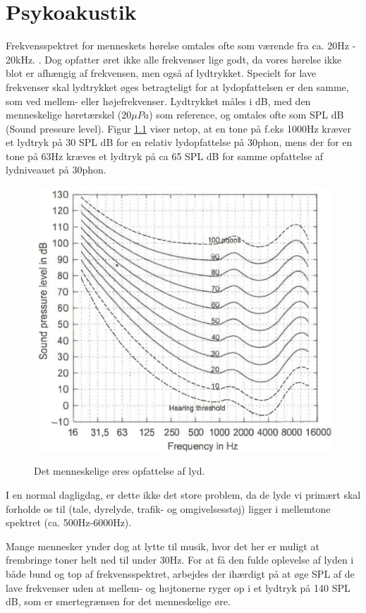 \chapter{Psykoakustik}

Frekvensspektret for menneskets hørelse omtales ofte som værende fra ca. 20Hz - 20kHz. \cite{Elektroakustik}. Dog opfatter øret ikke alle frekvenser lige godt, da vores hørelse ikke blot er afhængig af frekvensen, men også af lydtrykket. Specielt for lave frekvenser skal lydtrykket øges betragteligt for at lydopfattelsen er den samme, som ved mellem- eller højefrekvenser. Lydtrykket måles i dB, med den menneskelige høretærskel ($20\mu Pa$)  som reference, og omtales ofte som SPL dB (Sound pressure level). Figur \ref{fig:SPL} viser netop, at en tone på f.eks 1000Hz kræver et lydtryk på 30 SPL dB for en relativ lydopfattelse på 30phon, mens der for en tone på 63Hz kræves et lydtryk på ca 65 SPL dB for samme opfattelse af lydniveauet på 30phon.

\begin{figure}[h!]
	\centering
	\includegraphics[width=.6\textwidth]{Pics/SPL.PNG}
	\label{fig:SPL}
	\caption{Det menneskelige øres opfattelse af lyd. \cite{Elektroakustik}}
\end{figure}

I en normal dagligdag, er dette ikke det store problem, da de lyde vi primært skal forholde os til (tale, dyrelyde, trafik- og omgivelsesstøj) ligger i mellemtone spektret (ca. 500Hz-6000Hz). 

Mange mennesker ynder dog at lytte til musik, hvor det her er muligt at frembringe toner helt ned til under 30Hz. For at få den fulde oplevelse af lyden i både bund og top af frekvensspektret, arbejdes der ihærdigt på at øge SPL af de lave frekvenser uden at mellem- og højtonerne ryger op i et lydtryk på 140 SPL dB, som er smertegrænsen for det menneskelige øre.